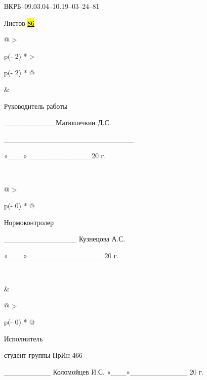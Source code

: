 ВКРБ--09.03.04--10.19--03--24--81

Листов \hl{\ul{86}}

\begin{longtable}[]{@{}
  >{\raggedright\arraybackslash}p{(\columnwidth - 2\tabcolsep) * }
  >{\raggedright\arraybackslash}p{(\columnwidth - 2\tabcolsep) * }@{}}
\toprule\noalign{}
\begin{minipage}[b]{\linewidth}\raggedright
\end{minipage} & \begin{minipage}[b]{\linewidth}\raggedright
Руководитель работы

\_\_\_\_\_\_\_\_\_\_Матюшечкин Д.С.

\_\_\_\_\_\_\_\_\_\_\_\_\_\_\_\_\_\_\_\_\_\_\_\_\_

«\_\_\_» \_\_\_\_\_\_\_\_\_\_\_\_20 г.
\end{minipage} \\
\midrule\noalign{}
\endhead
\bottomrule\noalign{}
\endlastfoot
\begin{minipage}[t]{\linewidth}\raggedright
\begin{longtable}[]{@{}
  >{\raggedright\arraybackslash}p{(\columnwidth - 0\tabcolsep) * }@{}}
\toprule\noalign{}
\begin{minipage}[b]{\linewidth}\raggedright
Нормоконтролер

\_\_\_\_\_\_\_\_\_\_\_\_\_\_ Кузнецова А.С.

«\_\_\_» \_\_\_\_\_\_\_\_\_\_\_\_\_\_ 20 г.
\end{minipage} \\
\midrule\noalign{}
\endhead
\bottomrule\noalign{}
\endlastfoot
\end{longtable}
\end{minipage} & \begin{minipage}[t]{\linewidth}\raggedright
\begin{longtable}[]{@{}
  >{\raggedright\arraybackslash}p{(\columnwidth - 0\tabcolsep) * }@{}}
\toprule\noalign{}
\begin{minipage}[b]{\linewidth}\raggedright
Исполнитель

студент группы ПрИн-466

\_\_\_\_\_\_\_\_\_ Коломойцев И.С. «\_\_\_»\_\_\_\_\_\_\_\_\_\_\_ 20 г.
\end{minipage} \\
\midrule\noalign{}
\endhead
\bottomrule\noalign{}
\endlastfoot
\end{longtable}
\end{minipage} \\
\end{longtable}

